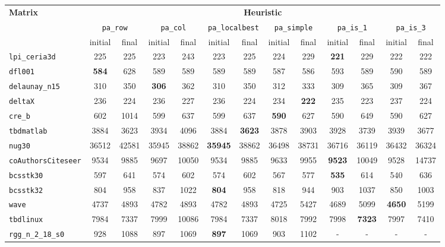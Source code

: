 \begin{table}
		\centering
	\begin{tabular}{|l|c|c||c|c||c|c||c|c||c|c||c|c|}
		\hline
		\multirow{3}{*}{\textbf{Matrix}} & \multicolumn{12}{c|}{\textbf{Heuristic}} \\ \cline{2-13}
		& \multicolumn{2}{c||}{\texttt{pa\_row}} &  \multicolumn{2}{c||}{\texttt{pa\_col}} & \multicolumn{2}{c||}{\texttt{pa\_localbest}} & \multicolumn{2}{c||}{\texttt{pa\_simple}} & \multicolumn{2}{c||}{\texttt{pa\_is\_1}} & \multicolumn{2}{c|}{\texttt{pa\_is\_3}} \\\cline{2-13}
		& initial & final & initial & final & initial & final & initial & final & initial & final & initial & final \\ \hline
		\verb|lpi_ceria3d| & 225 & 225 & 223 & 243 & 223 & 225 &  224 & 229 & \textbf{221} & 229 & 222 & 222 \\
		\verb|dfl001| & \textbf{584} & 628 & 589 & 589 & 589 & 589 & 587 & 586 & 593 & 589 & 590 & 589 \\
		\verb|delaunay_n15| & 310 & 350 & \textbf{306} & 362 & 310 & 350 & 312 & 333 & 309 & 365 & 309 & 367\\
		\verb|deltaX| & 236 & 224 & 236 & 227 & 236 & 224 & 234 & \textbf{222} & 235 & 223 & 237 & 224 \\
		\verb|cre_b| & 602 & 1014 & 599 & 637 & 599 & 637 & \textbf{590} & 627 & 590 & 649 & 590 & 627 \\
		\verb|tbdmatlab|& 3884 & 3623 & 3934 & 4096 & 3884 & \textbf{3623} & 3878 & 3903 & 3928 & 3739 & 3939 & 3677 \\
		\verb|nug30| & 36512 & 42581 & 35945 & 38862 & \textbf{35945} & 38862 & 36498 & 38731 & 36716 & 36119 & 36432 & 36324 \\
		\verb|coAuthorsCiteseer| & 9534 & 9885 & 9697 & 10050 & 9534 & 9885 & 9633 & 9955 & \textbf{9523} & 10049 & 9528 & 14737 \\
		\verb|bcsstk30| & 597 & 641 & 574 & 602 & 574 & 602 & 567 & 577 & \textbf{535} & 614 & 540 & 636 \\
		\verb|bcsstk32| & 804 & 958 & 837 & 1022 & \textbf{804} & 958 & 818 & 944 & 903 & 1037 & 850 & 1003 \\
		\verb|wave| & 4737 & 4893 & 4782 & 4893 & 4782 & 4893 & 4725 & 5427 & 4689 & 5099 & \textbf{4650} & 5199 \\
		\verb|tbdlinux| &  7984 & 7337 & 7999 & 10086 & 7984 & 7337 & 8018 & 7992 & 7998 & \textbf{7323} & 7997 & 7410 \\
		\verb|rgg_n_2_18_s0| & 928 & 1088 & 897 & 1069 & \textbf{897} & 1069 & 903 & 1102 & - & - & - & - \\

\end{tabular}
\end{table}
